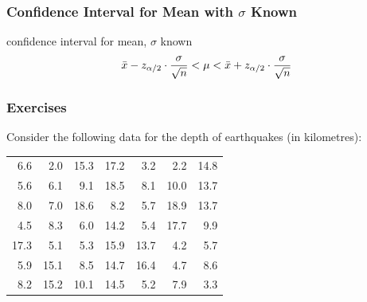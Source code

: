 \documentclass[xcolor=dvipsnames]{beamer}
\begin{document}
\begin{frame}
  \frametitle{Confidence Interval for Mean with $\sigma$
    Known}
  \begin{block}{confidence interval for mean, $\sigma$ known}
    \begin{equation}
      \label{eq:jaenguta}
      \bar{x}-z_{\alpha/2}\cdot\frac{\sigma}{\sqrt{n}}<\mu<\bar{x}+z_{\alpha/2}\cdot\frac{\sigma}{\sqrt{n}}\notag
    \end{equation}
  \end{block}
\end{frame}


\begin{frame}
  \frametitle{Exercises}
  {\ubung} Consider the following data for the depth of earthquakes (in
  kilometres):

\medskip

  \begin{tabular}{|rrrrrrr|}\hline
     6.6 &  2.0 & 15.3 & 17.2 &  3.2 &  2.2 & 14.8 \\ 
     5.6 &  6.1 &  9.1 & 18.5 &  8.1 & 10.0 & 13.7 \\ 
     8.0 &  7.0 & 18.6 &  8.2 &  5.7 & 18.9 & 13.7 \\ 
     4.5 &  8.3 &  6.0 & 14.2 &  5.4 & 17.7 &  9.9 \\ 
    17.3 &  5.1 &  5.3 & 15.9 & 13.7 &  4.2 &  5.7 \\ 
     5.9 & 15.1 &  8.5 & 14.7 & 16.4 &  4.7 &  8.6 \\ 
     8.2 & 15.2 & 10.1 & 14.5 &  5.2 &  7.9 &  3.3 \\ \hline
  \end{tabular}
\end{frame}
\end{document}

